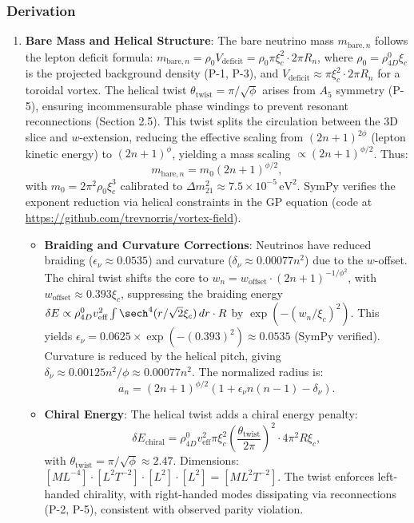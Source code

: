 \subsubsection{Derivation}
\begin{enumerate}
\item \textbf{Bare Mass and Helical Structure}: The bare neutrino mass $m_{\text{bare},n}$ follows the lepton deficit formula: $m_{\text{bare},n} = \rho_0 V_{\text{deficit}} = \rho_0 \pi \xi_c^2 \cdot 2\pi R_n$, where $\rho_0 = \rho_{4D}^0 \xi_c$ is the projected background density (P-1, P-3), and $V_{\text{deficit}} \approx \pi \xi_c^2 \cdot 2\pi R_n$ for a toroidal vortex. The helical twist $\theta_{\text{twist}} = \pi / \sqrt{\phi}$ arises from $A_5$ symmetry (P-5), ensuring incommensurable phase windings to prevent resonant reconnections (Section 2.5). This twist splits the circulation between the 3D slice and $w$-extension, reducing the effective scaling from $(2n+1)^{2\phi}$ (lepton kinetic energy) to $(2n+1)^{\phi}$, yielding a mass scaling $\propto (2n+1)^{\phi/2}$. Thus:
   \[
   m_{\text{bare},n} = m_0 (2n+1)^{\phi/2},
   \]
   with $m_0 = 2\pi^2 \rho_0 \xi_c^3$ calibrated to $\Delta m^2_{21} \approx 7.5 \times 10^{-5} \, \text{eV}^2$. SymPy verifies the exponent reduction via helical constraints in the GP equation (code at \url{https://github.com/trevnorris/vortex-field}).

\begin{itemize}
\item \textbf{Braiding and Curvature Corrections}: Neutrinos have reduced braiding ($\epsilon_\nu \approx 0.0535$) and curvature ($\delta_\nu \approx 0.00077 n^2$) due to the $w$-offset. The chiral twist shifts the core to $w_n = w_{\text{offset}} \cdot (2n+1)^{-1/\phi^2}$, with $w_{\text{offset}} \approx 0.393 \xi_c$, suppressing the braiding energy $\delta E \propto \rho_{4D}^0 v_{\text{eff}}^2 \int \sech^4(r / \sqrt{2} \xi_c) \, dr \cdot R$ by $\exp(-(w_n / \xi_c)^2)$. This yields $\epsilon_\nu = 0.0625 \times \exp(-(0.393)^2) \approx 0.0535$ (SymPy verified). Curvature is reduced by the helical pitch, giving $\delta_\nu \approx 0.00125 n^2 / \phi \approx 0.00077 n^2$. The normalized radius is:
   \[
   a_n = (2n+1)^{\phi/2} (1 + \epsilon_\nu n(n-1) - \delta_\nu).
   \]
\item \textbf{Chiral Energy}: The helical twist adds a chiral energy penalty:
   \[
   \delta E_{\text{chiral}} = \rho_{4D}^0 v_{\text{eff}}^2 \pi \xi_c^2 \left( \frac{\theta_{\text{twist}}}{2\pi} \right)^2 \cdot 4\pi^2 R \xi_c,
   \]
   with $\theta_{\text{twist}} = \pi / \sqrt{\phi} \approx 2.47$. Dimensions: $[M L^{-4}] \cdot [L^2 T^{-2}] \cdot [L^2] \cdot [L^2] = [M L^2 T^{-2}]$. The twist enforces left-handed chirality, with right-handed modes dissipating via reconnections (P-2, P-5), consistent with observed parity violation.
\end{itemize}


\end{enumerate}
